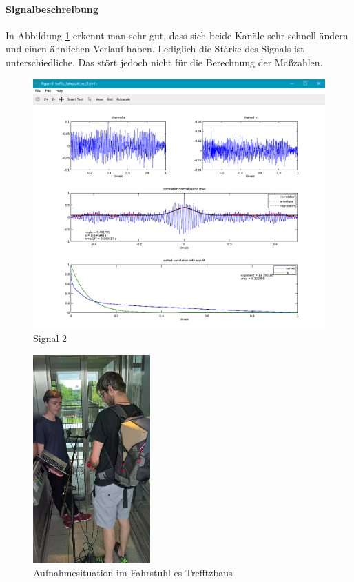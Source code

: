 \paragraph{Signalbeschreibung}
In Abbildung \ref{figure3}  erkennt man sehr gut, dass sich beide Kanäle sehr schnell ändern und einen ähnlichen Verlauf haben. Lediglich die Stärke des Signals ist unterschiedliche. Das stört jedoch nicht für die Berechnung der Maßzahlen. 
\begin{figure}[ht!]
  \centering
  \includegraphics[scale=0.64]{img/trefftz_fahrstuhl_m}
  \caption{Signal 2}
  \label{figure3}
\end{figure}

\begin{figure}[ht!]
  \centering
  \includegraphics[width=0.4\textwidth]{img/fahrstuhl}
  \caption{Aufnahmesituation im Fahrstuhl es Trefftzbaus}
  \label{figure4}
\end{figure}

